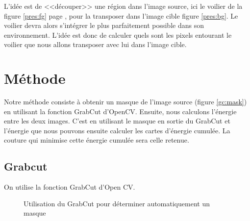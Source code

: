 \documentclass[a4paper]{article}
\begin{document}
L'idée est de <<découper>> une région dans l'image source, ici le voilier de la figure \ref{pres:fg} page
\pageref{pres:fg}, pour la transposer dans l'image cible figure \ref{pres:bg}. 
Le voilier devra alors s'intégrer le plus parfaitement possible dans son environnement. L'idée est donc de
calculer quels sont les pixels entourant le voilier que nous allons transposer avec lui dans l'image cible.

\section{Méthode}         
Notre méthode consiste à obtenir un masque de l'image source (figure \ref{gc:mask}) en utilisant la fonction GrabCut d'OpenCV. 
Ensuite, nous calculons l'énergie entre les deux images. C'est en utilisant le masque en sortie du GrabCut et l'énergie que nous 
pouvons ensuite calculer les cartes d'énergie cumulée. La couture qui minimise cette énergie cumulée sera celle retenue.

\subsection{Grabcut}      
On utilise la fonction GrabCut d'Open CV.
\begin{figure}[!ht]%
    \centering
    \hspace{0.030\textwidth}
    \caption{Utilisation du GrabCut pour déterminer automatiquement un masque}
    \label{gc}
\end{figure}
\end{document}
